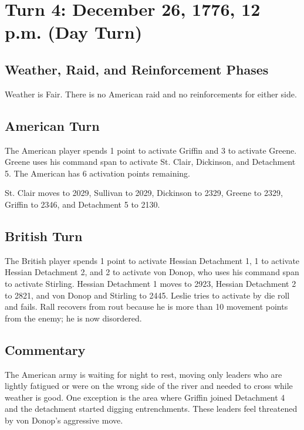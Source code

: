 \documentclass[11pt]{article}
\begin{document}
\clearpage
\section{Turn 4: December 26, 1776, 12 p.m. (Day Turn)}

\subsection{Weather, Raid, and Reinforcement Phases}

Weather is Fair. There is no American raid and no reinforcements for either side.

\subsection{American Turn}

The American player spends 1 point to activate Griffin and 3 to activate Greene. Greene uses his command span to activate St. Clair, Dickinson, and Detachment 5. The American has 6 activation points remaining.

St. Clair moves to 2029, Sullivan to 2029, Dickinson to 2329, Greene to 2329, Griffin to 2346, and Detachment 5 to 2130.

\subsection{British Turn}

The British player spends 1 point to activate Hessian Detachment 1, 1 to activate Hessian Detachment 2, and 2 to activate von Donop, who uses his command span to activate Stirling. Hessian Detachment 1 moves to 2923, Hessian Detachment 2 to 2821, and von Donop and Stirling to 2445. Leslie tries to activate by die roll and fails. Rall recovers from rout because he is more than 10 movement points from the enemy; he is now disordered.

\subsection{Commentary}

The American army is waiting for night to rest, moving only leaders who are lightly fatigued or were on the wrong side of the river and needed to cross while weather is good. One exception is the area where Griffin joined Detachment 4 and the detachment started digging entrenchments. These leaders feel threatened by von Donop's aggressive move.
\end{document}
